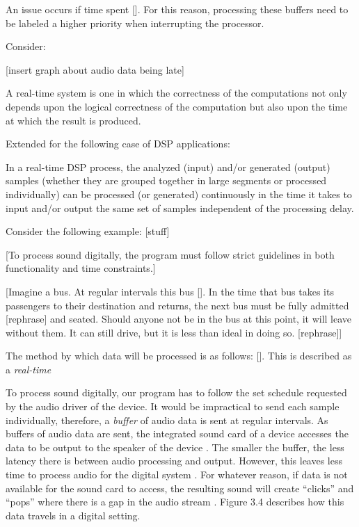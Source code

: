 An issue occurs if time spent []. For this reason, processing these buffers need to be labeled a higher priority when interrupting the processor.

Consider:

[insert graph about audio data being late]

\begin{defn}\label{def3}
\hfill \break
A real-time system is one in which the correctness of the computations not
only depends upon the logical correctness of the computation but also upon
the time at which the result is produced.

\begin{center}
\hspace*{-6.8cm}\textnormal{Extended for the following case of DSP applications:}
\end{center}

\hspace*{-0.6cm}In a real-time DSP process, the analyzed (input) and/or generated (output)
samples (whether they are grouped together in large segments or processed
individually) can be processed (or generated) continuously in the time it
takes to input and/or output the same set of samples independent of the
processing delay.

\end{defn}

Consider the following example: [stuff]

[To process sound digitally, the program must follow strict guidelines in both functionality and time constraints.]

[Imagine a bus. At regular intervals this bus []. In the time that bus takes its passengers to their destination and returns, the next bus must be fully admitted [rephrase] and seated. Should anyone not be in the bus at this point, it will leave without them. It can still drive, but it is less than ideal in doing so. [rephrase]]



The method by which data will be processed is as follows: []. This is described as a \textit{real-time}

To process sound digitally, our program has to follow the set schedule requested by the audio driver of the device. It would be impractical to send each sample individually, therefore, a \textit{buffer} of audio data is sent at regular intervals. As buffers of audio data are sent, the integrated sound card of a device accesses the data to be output to the speaker of the device  \cite{Walker_2005}. The smaller the buffer, the less latency there is between audio processing and output. However, this leaves less time to process audio for the digital system \cite{corless2009pc-based}. For whatever reason, if data is not available for the sound card to access, the resulting sound will create ``clicks'' and ``pops'' where there is a gap in the audio stream \cite{Walker_2005}. Figure 3.4 describes how this data travels in a digital setting.

